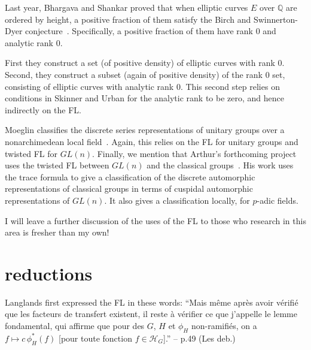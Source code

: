 \documentclass[brochure,english,12pt]{bourbaki}
\newcommand{\ring}[1]{\mathbb{#1}}
\begin{document}

Last year, Bhargava and Shankar proved that when elliptic curves $E$
over $\ring{Q}$ are ordered by height, a positive fraction of them
satisfy the Birch and Swinnerton-Dyer conjecture~\cite{BS:2010}.
Specifically, a positive fraction of them have rank $0$ and analytic
rank $0$.

First they construct a set (of positive
density) of elliptic curves with rank $0$.  Second, they construct a
subset (again of positive density) of the rank $0$ set, consisting of
elliptic curves with analytic rank $0$.  This second step relies on
conditions in Skinner and Urban for the analytic rank to be zero, and hence
indirectly on the FL.


Moeglin classifies the discrete series representations of unitary
groups over a nonarchimedean local field~\cite{Moeglin:2007}.  Again, this
relies on the FL for unitary groups and twisted FL for
$GL(n)$. Finally, we mention that Arthur's forthcoming project uses
the twisted FL between $GL(n)$ and the classical
groups~\cite{Arthur:2011}.  His work uses the trace formula to give a
classification of the discrete automorphic representations of
classical groups in terms of cuspidal automorphic representations of
$GL(n)$.  It also gives a classification locally, for $p$-adic fields.

I will leave a further discussion of the uses of the FL to those who research
in this area is fresher than my own!

%
%







\section{reductions}\label{sec:reduce}

Langlands first expressed the FL in these words:
``Mais m\^eme apr\`es avoir
v\'erifi\'e que les facteurs de
transfert existent, il reste \`a v\'erifier ce que j'appelle le
lemme fondamental, qui affirme que pour des $G$, $H$ et $\phi_H$
non-ramifi\'es, on a $f\mapsto c\, \phi_H^*(f)$ [pour toute fonction $f\in {\mathcal H}_G$].''
 -- p.49 (Les deb.)  \cite[p.49]{Langlands:debuts}
\end{document}
